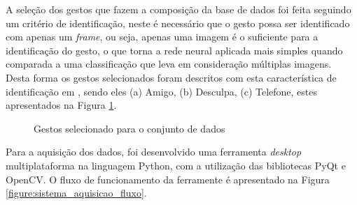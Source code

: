 \par A seleção dos gestos que fazem a composição da base de dados foi feita seguindo um critério de identificação, neste é necessário que o gesto possa ser identificado com apenas um \textit{frame}, ou seja, apenas uma imagem é o suficiente para a identificação do gesto, o que torna a rede neural aplicada mais simples quando comparada a uma classificação que leva em consideração múltiplas imagens. Desta forma os gestos selecionados foram descritos com esta característica de identificação em \cite{Magalh2018}, sendo eles (a) Amigo, (b) Desculpa, (c) Telefone, estes apresentados na Figura \ref{figure:gestos_selecionados}.

\begin{figure}[H]
    \centering
    \qquad
    \qquad
    \qquad
    \caption{Gestos selecionado para o conjunto de dados}%
    \label{figure:gestos_selecionados}%
\end{figure}

\par Para a aquisição dos dados, foi desenvolvido uma ferramenta \textit{desktop} multiplataforma na linguagem Python, com a utilização das bibliotecas PyQt e OpenCV. O fluxo de funcionamento da ferramente é apresentado na Figura \ref{figure:sistema_aquisicao_fluxo}.

